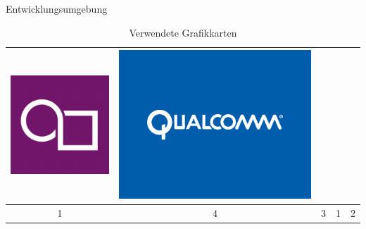 \begin{frame}{Entwicklungsumgebung}
\begin{table}[h]
\begin{tabular}{c|c|c|c|c}
		\includegraphics[width=\textwidth, height=0.1\textheight, keepaspectratio]{images/powerVR-logo} &
		\includegraphics[width=\textwidth, height=0.1\textheight, keepaspectratio]{images/qualcomm-logo} \\ \hline
		1 & 4 & 3 & 1 & 2
	\end{tabular}
	\caption{Verwendete Grafikkarten}
\end{table}
\end{frame}


